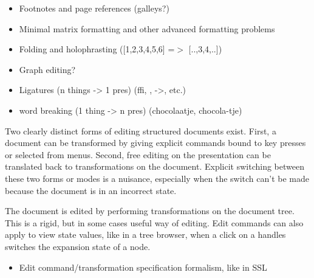 

\begin{itemize}
\item Footnotes and page references (galleys?)
\item Minimal matrix formatting and other advanced formatting
          problems
\item Folding and holophrasting ([1,2,3,4,5,6] =$>$ [..,3,4,..])
\item Graph editing?
\item Ligatures (n things -> 1 pres) (ffi, \alpha, ->, etc.)
\item word breaking (1 thing -> n pres) (chocolaatje, chocola-tje)

\end{itemize}



\par Two clearly distinct forms of editing structured documents exist.
        First, a document can be transformed by giving explicit commands bound to key
        presses or selected from menus. Second, free editing on the presentation can be
        translated back to transformations on the document. Explicit switching between
        these two forms or modes is a nuisance, especially when the switch can't be
        made because the document is in an incorrect state.

\par The document is edited by performing transformations on the document
        tree. This is a rigid, but in some cases useful way of editing. Edit commands
        can also apply to view state values, like in a tree browser, when a click on a
        handles switches the expansion state of a node. 
 \begin{itemize}
 
 \item Edit command/transformation specification formalism, like in
          SSL
 \end{itemize}



